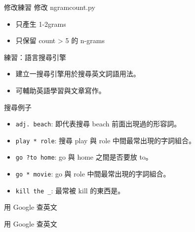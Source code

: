 \documentclass[12pt,c]{beamer}
\begin{document}
\begin{frame}{修改練習}
  修改 ngramcount.py
  \begin{itemize}
  \item 只產生 1-2grams
  \item 只保留 count > 5 的 n-grams
  \end{itemize}

\end{frame}


\begin{frame}{練習：語言搜尋引擎}
  \begin{itemize}
  \item 建立一搜尋引擎用於搜尋英文詞語用法。
  \item 可輔助英語學習與文章寫作。
  \end{itemize}
  \begin{block}{搜尋例子}
    \begin{itemize}
    \item \lstinline|adj. beach|: 即代表搜尋 beach 前面出現過的形容詞。
    \item \lstinline|play * role|: 搜尋 play 與 role 中間最常出現的字詞組合。
    \item \lstinline|go ?to home|: go 與 home 之間是否要放 to。
    \item \lstinline|go * movie|: go 與 role 中間最常出現的字詞組合。 
    \item \lstinline|kill the _|: 最常被 kill 的東西是。
    \end{itemize}
  \end{block}
\end{frame}

\begin{frame}[t,plain]{用 Google 查英文}
\end{frame}

\begin{frame}[t,plain]{用 Google 查英文}
\end{frame}
\end{document}
